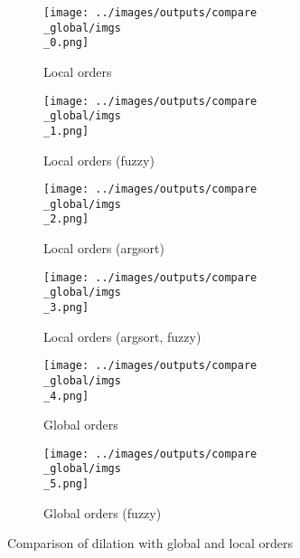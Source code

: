\begin{figure}[!ht]
  \centering
  \begin{subfigure}[t]{0.4\textwidth}
    \texttt{[image: ../images/outputs/compare\\\_global/imgs\\\_0.png]}
    \caption{Local orders}
    \centering
  \end{subfigure}
  \begin{subfigure}[t]{0.4\textwidth}
    \texttt{[image: ../images/outputs/compare\\\_global/imgs\\\_1.png]}
    \caption{Local orders (fuzzy)}
    \centering
  \end{subfigure}
  \begin{subfigure}[t]{0.4\textwidth}
    \texttt{[image: ../images/outputs/compare\\\_global/imgs\\\_2.png]}
    \caption{Local orders (argsort)}
    \centering
  \end{subfigure}
  \begin{subfigure}[t]{0.4\textwidth}
    \texttt{[image: ../images/outputs/compare\\\_global/imgs\\\_3.png]}
    \caption{Local orders (argsort, fuzzy)}
    \centering
  \end{subfigure}
  \begin{subfigure}[t]{0.4\textwidth}
    \texttt{[image: ../images/outputs/compare\\\_global/imgs\\\_4.png]}
    \caption{Global orders}
    \centering
  \end{subfigure}
  \begin{subfigure}[t]{0.4\textwidth}
    \texttt{[image: ../images/outputs/compare\\\_global/imgs\\\_5.png]}
    \caption{Global orders (fuzzy)}
    \centering
  \end{subfigure}
  \caption{Comparison of dilation with global and local orders}
\end{figure}
